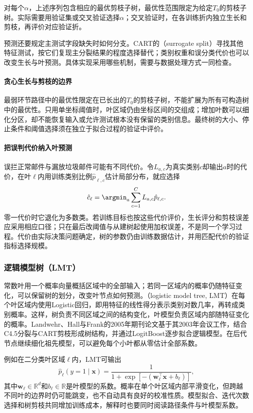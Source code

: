 对每个$\alpha$，上述序列包含相应的最优剪枝子树，最优性范围限定为给定$T_0$的剪枝子树。实际需要用验证集或交叉验证选择$\alpha$；交叉验证时，在各训练折内独立生长和剪枝，再评价对应验证折。

预测还要规定主测试字段缺失时如何分支。CART的（surrogate split）寻找其他特征测试，按它们复现主分裂结果的程度选择替代；类别权重和误分类代价也可以改变生长与叶预测。具体实现采用哪些机制，需要与数据处理方式一同检查。

\paragraph{贪心生长与剪枝的边界}
\label{sec:classification-cart-theory}
最弱环节路径中的最优性限定在已长出的$T_0$的剪枝子树，不能扩展为所有可构造树中的最优性。只用单坐标阈值时，叶区域仍由坐标区间的交组成；增加叶数可以细化分区，却不能恢复输入或允许测试根本没有保留的类别信息。最终树的大小、停止条件和阈值选择须在独立于拟合过程的验证中评价。

\paragraph{把误判代价纳入叶预测}
误拦正常邮件与漏放垃圾邮件可能有不同代价。令$L_{a,c}$为真实类别$c$却输出$a$时的代价，在叶$\ell$内用训练类别比例$\hat p_{\ell,c}$估计局部分布，就应选择
\[
  \hat c_\ell=\argmin_a\sum_{c=1}^C L_{a,c}\hat p_{\ell,c}.
\]
零一代价时它退化为多数类。若训练目标也按这些代价评价，生长评分和剪枝误差应采用相应口径；只在最后改阈值与从建树起使用加权误差，不是同一个学习过程。代价由实际决策问题确定，树的参数仍由训练数据估计，并用匹配代价的验证指标选择规模。

\subsubsection{逻辑模型树（LMT）}

常数叶用一个概率向量概括区域中的全部输入；若同一区域内的概率仍随特征变化，可以保留树的划分，改变叶节点如何预测。（logistic model tree, LMT）在每个叶区域内使用Logistic回归，即用特征的线性得分表示类别对数几率，再转成类别概率。这样，树负责不同区域之间的结构变化，叶模型负责区域内部随特征变化的概率。Landwehr、Hall与Frank的2005年期刊论文基于其2003年会议工作，结合C4.5分裂与CART剪枝形成树结构，并通过LogitBoost逐步拟合逻辑模型。在后代节点继续细化祖先模型，可以避免每个小叶都从零估计全部系数。

例如在二分类叶区域$\ell$内，LMT可输出
\begin{equation}
  \hat p_\ell(y=1\mid\bm{x})
  =\frac{1}{1+\exp[-(\bm{w}_\ell^\top\bm{x}+b_\ell)]},
  \label{eq:classification-lmt-leaf}
\end{equation}
其中$\bm{w}_\ell\in\mathbb{R}^d$和$b_\ell\in\mathbb{R}$是叶模型的系数。概率在单个叶区域内部平滑变化，但跨越不同叶的边界时仍可能跳变，也不自动具有良好的校准性质。模型拟合、迭代次数选择和树剪枝共同增加训练成本，解释时也要同时阅读路径条件与叶模型系数。

